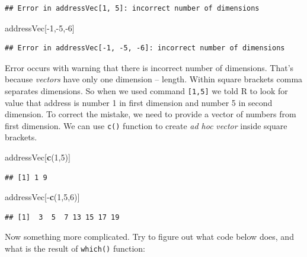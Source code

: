 \documentclass[]{book}
\newenvironment{Shaded}{\begin{snugshade}}{\end{snugshade}}
\newcommand{\KeywordTok}[1]{\textcolor[rgb]{0.12,0.11,0.11}{\textbf{#1}}}
\newcommand{\DecValTok}[1]{\textcolor[rgb]{0.69,0.50,0.00}{#1}}
\newcommand{\OperatorTok}[1]{\textcolor[rgb]{0.12,0.11,0.11}{#1}}
\newcommand{\NormalTok}[1]{\textcolor[rgb]{0.12,0.11,0.11}{#1}}
\theoremstyle{definition}
\theoremstyle{definition}
\theoremstyle{definition}
\theoremstyle{remark}
\begin{document}
\begin{verbatim}
## Error in addressVec[1, 5]: incorrect number of dimensions
\end{verbatim}

\begin{Shaded}
\begin{Highlighting}[]
\NormalTok{addressVec[}\OperatorTok{-}\DecValTok{1}\NormalTok{,}\OperatorTok{-}\DecValTok{5}\NormalTok{,}\OperatorTok{-}\DecValTok{6}\NormalTok{]}
\end{Highlighting}
\end{Shaded}

\begin{verbatim}
## Error in addressVec[-1, -5, -6]: incorrect number of dimensions
\end{verbatim}

Error occurs with warning that there is incorrect number of dimensions.
That's because \emph{vectors} have only one dimension -- length. Within
square brackets comma separates dimensions. So when we used command
\texttt{{[}1,5{]}} we told R to look for value that address is number 1
in first dimension and number 5 in second dimension. To correct the
mistake, we need to provide a vector of numbers from first dimension. We
can use \texttt{c()} function to create \emph{ad hoc} \emph{vector}
inside square brackets.

\begin{Shaded}
\begin{Highlighting}[]
\NormalTok{addressVec[}\KeywordTok{c}\NormalTok{(}\DecValTok{1}\NormalTok{,}\DecValTok{5}\NormalTok{)]}
\end{Highlighting}
\end{Shaded}

\begin{verbatim}
## [1] 1 9
\end{verbatim}

\begin{Shaded}
\begin{Highlighting}[]
\NormalTok{addressVec[}\OperatorTok{-}\KeywordTok{c}\NormalTok{(}\DecValTok{1}\NormalTok{,}\DecValTok{5}\NormalTok{,}\DecValTok{6}\NormalTok{)]}
\end{Highlighting}
\end{Shaded}

\begin{verbatim}
## [1]  3  5  7 13 15 17 19
\end{verbatim}

Now something more complicated. Try to figure out what code below does,
and what is the result of \texttt{which()} function:
\end{document}
